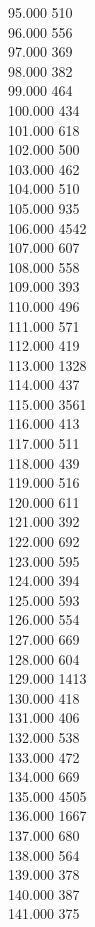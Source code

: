 { 95.000	510 \\
 96.000	556 \\
 97.000	369 \\
 98.000	382 \\
 99.000	464 \\
 100.000	434 \\
 101.000	618 \\
 102.000	500 \\
 103.000	462 \\
 104.000	510 \\
 105.000	935 \\
 106.000	4542 \\
 107.000	607 \\
 108.000	558 \\
 109.000	393 \\
 110.000	496 \\
 111.000	571 \\
 112.000	419 \\
 113.000	1328 \\
 114.000	437 \\
 115.000	3561 \\
 116.000	413 \\
 117.000	511 \\
 118.000	439 \\
 119.000	516 \\
 120.000	611 \\
 121.000	392 \\
 122.000	692 \\
 123.000	595 \\
 124.000	394 \\
 125.000	593 \\
 126.000	554 \\
 127.000	669 \\
 128.000	604 \\
 129.000	1413 \\
 130.000	418 \\
 131.000	406 \\
 132.000	538 \\
 133.000	472 \\
 134.000	669 \\
 135.000	4505 \\
 136.000	1667 \\
 137.000	680 \\
 138.000	564 \\
 139.000	378 \\
 140.000	387 \\
 141.000	375 \\
}

